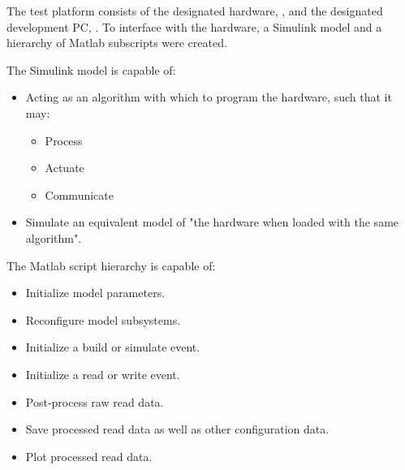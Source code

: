 \documentclass[crop=false,float=true,class=scrreprt]{standalone}
\begin{document}
The test platform consists of the designated hardware,
{},
and the designated development PC,
{}.
To interface with the hardware,
a Simulink model and a hierarchy of Matlab subscripts were created.

The Simulink model is capable of: 

\begin{itemize}[leftmargin=*, label=$\vcenter{\hbox{\tiny$\bullet$}}$, itemsep=-1em]

\item Acting as an algorithm with which to program the hardware, such that it may:
      \vspace*{-1em}
      \begin{itemize}[leftmargin=*, label=$\cdot$, itemsep=-1em]
      
      \item Process
      
      \item Actuate
      
      \item Communicate
      
      \end{itemize}

\item Simulate an equivalent model of "the hardware when loaded with the same algorithm".

\end{itemize}


The Matlab script hierarchy is capable of:

\begin{itemize}[leftmargin=*, label=$\vcenter{\hbox{\tiny$\bullet$}}$, itemsep=-1em]

\item Initialize model parameters.

\item Reconfigure model subsystems.

\item Initialize a build or simulate event.

\item Initialize a read or write event.

\item Post-process raw read data.

\item Save processed read data as well as other configuration data.

\item Plot processed read data.

\end{itemize}




\clearpage 
\end{document}
